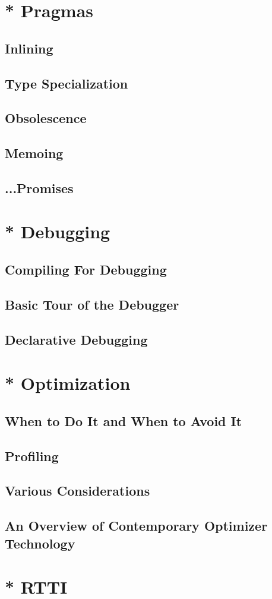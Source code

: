 \documentclass[a4paper,11pt,notitlepage,onecolumn]{article}
\begin{document}
\section{* Pragmas}
\subsection{Inlining}
\subsection{Type Specialization}
\subsection{Obsolescence}
\subsection{Memoing}
\subsection{...Promises}



\section{* Debugging}
\subsection{Compiling For Debugging}
\subsection{Basic Tour of the Debugger}
\subsection{Declarative Debugging}



\section{* Optimization}
\subsection{When to Do It and When to Avoid It}
\subsection{Profiling}
\subsection{Various Considerations}
\subsection{An Overview of Contemporary Optimizer Technology}



\section{* RTTI}
\end{document}
